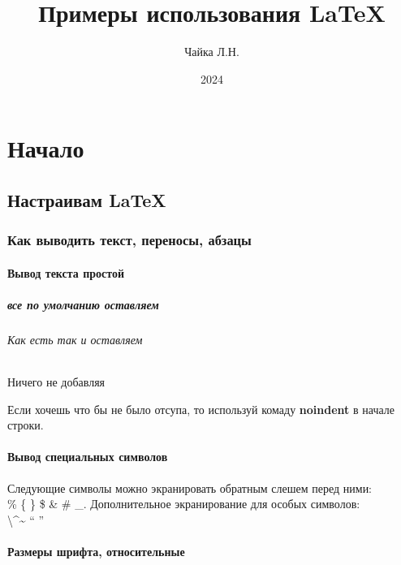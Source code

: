 \documentclass[a4paper,14pt]{book}
\title{Примеры использования LaTeX}
\author{Чайка Л.Н.}
\date{2024}
\begin{document}
\layout

\maketitle %

\part{Начало}

\chapter{Настраивам LaTeX}

\section{Как выводить текст, переносы, абзацы}

\subsection{Вывод текста простой}

\subsubsection{все по умолчанию оставляем}

\paragraph{Как есть так и оставляем}

\subparagraph{Ничего не добавляя}
Если хочешь что бы не было отсупа, то используй комаду
\textbf{noindent} в начале строки.\newline
\subsection{Вывод специальных символов}
Следующие символы можно экранировать обратным слешем
перед ними: \\
\% \{ \} \$ \& \# \_. Дополнительное экранирование для особых
символов: \\ \textbackslash  \textasciicircum \~{}  `` ''

\subsection{Размеры шрифта, относительные}
\end{document}
